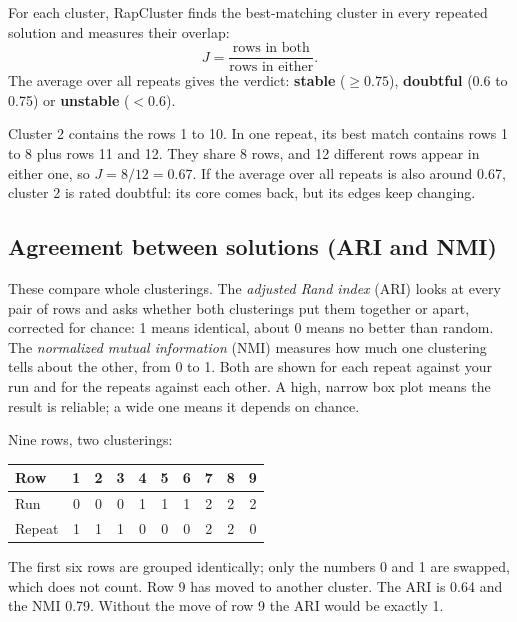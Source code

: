 \documentclass[11pt,a4paper]{article}
\begin{document}
For each cluster, RapCluster finds the best-matching cluster in every repeated solution and measures their overlap:
\[
  J = \frac{\text{rows in both}}{\text{rows in either}}.
\]
The average over all repeats gives the verdict: \textbf{stable} ($\ge 0.75$), \textbf{doubtful} (0.6 to 0.75) or
\textbf{unstable} ($< 0.6$).

\begin{example}
Cluster 2 contains the rows 1 to 10. In one repeat, its best match contains rows 1 to 8 plus rows 11 and 12. They
share 8 rows, and 12 different rows appear in either one, so $J = 8/12 = 0.67$. If the average over all repeats is
also around 0.67, cluster 2 is rated doubtful: its core comes back, but its edges keep changing.
\end{example}

\subsection{Agreement between solutions (ARI and NMI)}

These compare whole clusterings. The \emph{adjusted Rand index} (ARI) looks at every pair of rows and asks whether
both clusterings put them together or apart, corrected for chance: 1 means identical, about 0 means no better than
random. The \emph{normalized mutual information} (NMI) measures how much one clustering tells about the other, from
0 to 1. Both are shown for each repeat against your run and for the repeats against each other. A high, narrow box
plot means the result is reliable; a wide one means it depends on chance.

\begin{example}
Nine rows, two clusterings:
\begin{center}
\begin{tabular}{lccccccccc}
\toprule
Row & 1 & 2 & 3 & 4 & 5 & 6 & 7 & 8 & 9\\
\midrule
Run & 0 & 0 & 0 & 1 & 1 & 1 & 2 & 2 & 2\\
Repeat & 1 & 1 & 1 & 0 & 0 & 0 & 2 & 2 & 0\\
\bottomrule
\end{tabular}
\end{center}
The first six rows are grouped identically; only the numbers 0 and 1 are swapped, which does not count. Row 9 has
moved to another cluster. The ARI is 0.64 and the NMI 0.79. Without the move of row 9 the ARI would be exactly 1.
\end{example}
\end{document}
